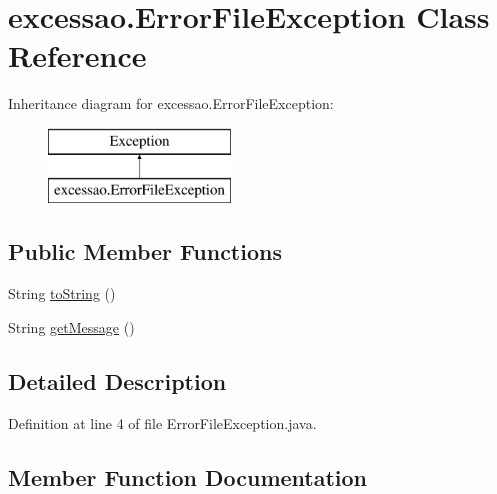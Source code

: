 \hypertarget{classexcessao_1_1ErrorFileException}{}\section{excessao.\+Error\+File\+Exception Class Reference}
\label{classexcessao_1_1ErrorFileException}
Inheritance diagram for excessao.\+Error\+File\+Exception\+:\begin{figure}[H]
\begin{center}
\leavevmode
\includegraphics[height=2.000000cm]{classexcessao_1_1ErrorFileException}
\end{center}
\end{figure}
\subsection*{Public Member Functions}
\begin{DoxyCompactItemize}
\item 
String \hyperlink{classexcessao_1_1ErrorFileException_af764a39592ff12424d4dd76ef9c1fc30}{to\+String} ()
\item 
String \hyperlink{classexcessao_1_1ErrorFileException_a9503bc596c17f4a9bde0bb3fe7d12b0a}{get\+Message} ()
\end{DoxyCompactItemize}


\subsection{Detailed Description}


Definition at line 4 of file Error\+File\+Exception.\+java.



\subsection{Member Function Documentation}
\hypertarget{classexcessao_1_1ErrorFileException_a9503bc596c17f4a9bde0bb3fe7d12b0a}{}\label{classexcessao_1_1ErrorFileException_a9503bc596c17f4a9bde0bb3fe7d12b0a} 
